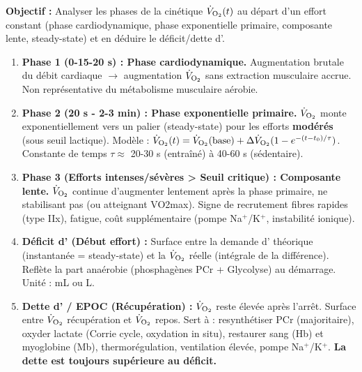 \documentclass[11pt]{article}
\begin{document}
\begin{methode}
    \textbf{Objectif :} Analyser les phases de la cinétique $\dot{V}_{\ce{O2}}(t)$ au départ d'un effort constant (phase cardiodynamique, phase exponentielle primaire, composante lente, steady-state) et en déduire le déficit/dette d'.
    \begin{enumerate}
        \item \textbf{Phase 1 (0-15-20 s) : Phase cardiodynamique.} Augmentation brutale du débit cardiaque $\to$ augmentation $\dot{V}_{\ce{O2}}$ sans extraction musculaire accrue. Non représentative du métabolisme musculaire aérobie.
        \item \textbf{Phase 2 (20 s - 2-3 min) : Phase exponentielle primaire.} $\dot{V}_{\ce{O2}}$ monte exponentiellement vers un palier (steady-state) pour les efforts \textbf{modérés} (sous seuil lactique). Modèle : $\dot{V}_{\ce{O2}}(t) = \dot{V}_{\ce{O2}}(\text{base}) + \Delta \dot{V}_{\ce{O2}} (1 - e^{-(t-t_0)/\tau})$. Constante de temps $\tau \approx$ 20-30 s (entraîné) à 40-60 s (sédentaire).
        \item \textbf{Phase 3 (Efforts intenses/sévères > Seuil critique) : Composante lente.} $\dot{V}_{\ce{O2}}$ continue d'augmenter lentement après la phase primaire, ne stabilisant pas (ou atteignant VO2max). Signe de recrutement fibres rapides (type IIx), fatigue, coût  supplémentaire (pompe Na$^+$/K$^+$, instabilité ionique).
        \item \textbf{Déficit d' (Début effort) :} Surface entre la demande d' théorique (instantanée = steady-state) et la $\dot{V}_{\ce{O2}}$ réelle (intégrale de la différence). Reflète la part anaérobie (phosphagènes PCr + Glycolyse) au démarrage. Unité : mL ou L.
        \item \textbf{Dette d' / EPOC (Récupération) :} $\dot{V}_{\ce{O2}}$ reste élevée après l'arrêt. Surface entre $\dot{V}_{\ce{O2}}$ récupération et $\dot{V}_{\ce{O2}}$ repos. Sert à : resynthétiser PCr (majoritaire), oxyder lactate (Corrie cycle, oxydation in situ), restaurer  sang (Hb) et myoglobine (Mb), thermorégulation, ventilation élevée, pompe Na$^+$/K$^+$. \textbf{La dette est toujours supérieure au déficit.}
    \end{enumerate}
\end{methode}
\end{document}
